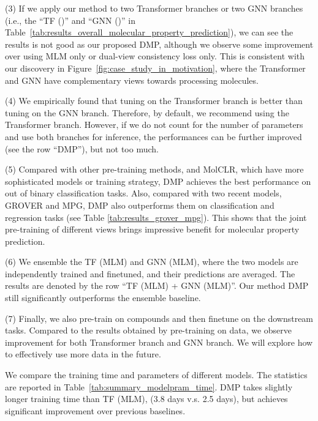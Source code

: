 \documentclass{article}
\newcommand{\ourM}{DMP}
\newcommand{\ourMTF}{DMP}
\begin{document}
\noindent(3) If we apply our method to two Transformer branches or two GNN branches (i.e., the ``TF ()'' and ``GNN ()'' in Table~\ref{tab:results_overall_molecular_property_prediction}), we can see the results is not good as our proposed \ourM{}, although we observe some improvement over using MLM only or dual-view consistency loss only. This is consistent with our discovery in Figure~\ref{fig:case_study_in_motivation}, where the Transformer and GNN have complementary views towards processing molecules.

\noindent(4) We empirically found that tuning on the Transformer branch is better than tuning on the GNN branch. Therefore, by default, we recommend using the Transformer branch. However, if we do not count for the number of parameters and use both branches for inference, the performances can be further improved (see the row ``\ourM{}''), but not too much.

\noindent(5) Compared with other pre-training methods, \citet{hu2019strategies} and MolCLR, which have more sophisticated models or training strategy, \ourMTF{} achieves the best performance on  out of  binary classification tasks. Also, compared with two recent models, GROVER and MPG,  \ourMTF{} also outperforms them on  classification and regression tasks (see Table \ref{tab:results_grover_mpg}). This shows that the joint pre-training of different views brings impressive benefit for molecular property prediction.

\noindent(6) We ensemble the TF (MLM) and GNN (MLM), where the two models are independently trained and finetuned, and their predictions are averaged. The results are denoted by the row ``TF (MLM) + GNN (MLM)''. Our method \ourMTF{} still significantly outperforms the ensemble baseline.
 
\noindent(7) Finally, we also pre-train on  compounds and then finetune on the downstream tasks. Compared to the results obtained by pre-training on  data, we observe improvement for both Transformer branch and GNN branch. We will explore how to effectively use more data in the future. 


We compare the training time and parameters of different models. The statistics are reported in Table~\ref{tab:summary_modelpram_time}. DMP takes slightly longer training time than TF (MLM), (3.8 days v.s. 2.5 days), but achieves significant improvement over previous baselines.
\end{document}
